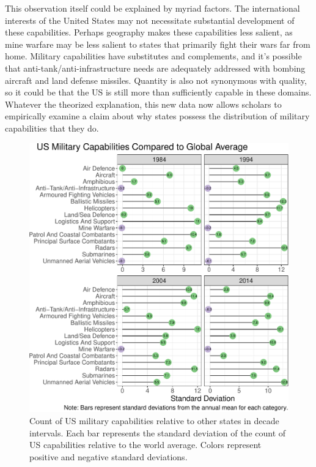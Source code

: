 \documentclass[
]{article}
\begin{document}
This observation itself could be explained by myriad factors. The international interests of the United States may not necessitate substantial development of these capabilities. Perhaps geography makes these capabilities less salient, as mine warfare may be less salient to states that primarily fight their wars far from home. Military capabilities have substitutes and complements, and it's possible that anti-tank/anti-infrastructure needs are adequately addressed with bombing aircraft and land defense missiles. Quantity is also not synonymous with quality, so it could be that the US is still more than sufficiently capable in these domains. Whatever the theorized explanation, this new data now allows scholars to empirically examine a claim about why states possess the distribution of military capabilities that they do.

\begin{figure}[H]

{\centering \includegraphics{2021-09-24_rDMC_files/figure-latex/lollipop-us-1} 

}

\caption{Count of US military capabilities relative to other states in decade intervals. Each bar represents the standard deviation of the count of US capabilities relative to the world average. Colors represent positive and negative standard deviations.}\label{fig:lollipop-us}
\end{figure}
\end{document}

